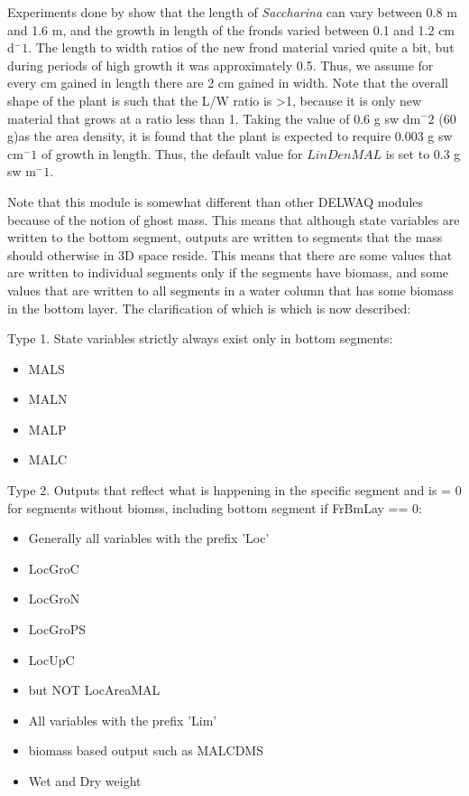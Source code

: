 \documentclass{deltares_manual}
\begin{document}
Experiments done by \cite{sjotun1993} show that the length of \textit{Saccharina} can vary between 0.8 m and 1.6 m, and the growth in length of the fronds varied between 0.1 and 1.2 cm d${^-1}$. The length to width ratios of the new frond material varied quite a bit, but during periods of high growth it was approximately 0.5. Thus, we assume for every cm gained in length there are 2 cm gained in width. Note that the overall shape of the plant is such that the L/W ratio is \textgreater 1, because it is only new material that grows at a ratio less than 1. Taking the \cite{broch2012} value of 0.6 g sw dm${^-2}$ (60 g)as the area density, it is found that the plant is expected to require 0.003 g sw cm${^-1}$ of growth in length. Thus, the default value for $LinDenMAL$ is set to 0.3 g sw m${^-1}$.

Note that this module is somewhat different than other DELWAQ modules because of the notion of ghost mass. This means that although state variables are written to the bottom segment, outputs are written to segments that the mass should otherwise in 3D space reside. This means that there are some values that are written to individual segments only if the segments have biomass, and some values that are written to all segments in a water column that has some biomass in the bottom layer. The clarification of which is which is now described:
 
Type 1. State variables strictly always exist only in bottom segments:
\begin{itemize}
	\item MALS
	\item MALN
	\item MALP
	\item MALC
\end{itemize}

Type 2. Outputs that reflect what is happening in the specific segment and is = 0 for segments without biomss, including bottom segment if FrBmLay == 0:
\begin{itemize}
	\item Generally all variables with the prefix 'Loc'
	\item LocGroC
	\item LocGroN
	\item LocGroPS
	\item LocUpC
	\item but NOT LocAreaMAL
	\item All variables with the prefix 'Lim'
	\item biomass based output such as MALCDMS
	\item Wet and Dry weight
\end{itemize}
\end{document}
